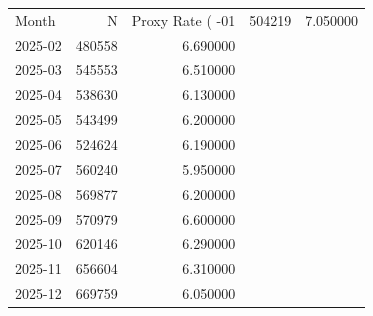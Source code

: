 \begin{tabular}{lrr}
\toprule
Month & N & Proxy Rate (%
-01 & 504219 & 7.050000 \\
2025-02 & 480558 & 6.690000 \\
2025-03 & 545553 & 6.510000 \\
2025-04 & 538630 & 6.130000 \\
2025-05 & 543499 & 6.200000 \\
2025-06 & 524624 & 6.190000 \\
2025-07 & 560240 & 5.950000 \\
2025-08 & 569877 & 6.200000 \\
2025-09 & 570979 & 6.600000 \\
2025-10 & 620146 & 6.290000 \\
2025-11 & 656604 & 6.310000 \\
2025-12 & 669759 & 6.050000 \\
\bottomrule
\end{tabular}
